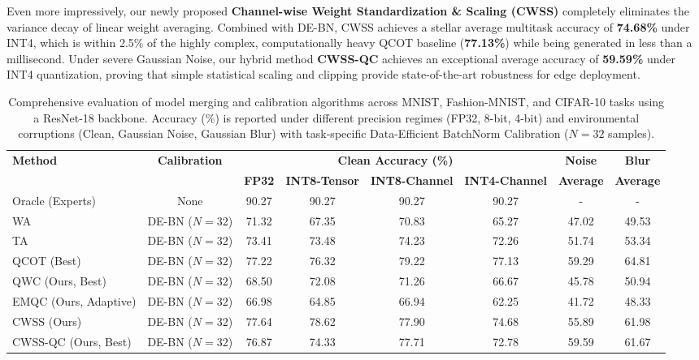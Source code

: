 \documentclass{article}
\theoremstyle{plain}
\theoremstyle{definition}
\theoremstyle{remark}
\begin{document}
Even more impressively, our newly proposed \textbf{Channel-wise Weight Standardization \& Scaling (CWSS)} completely eliminates the variance decay of linear weight averaging. Combined with DE-BN, CWSS achieves a stellar average multitask accuracy of \textbf{74.68\%} under INT4, which is within 2.5\% of the highly complex, computationally heavy QCOT baseline (\textbf{77.13\%}) while being generated in less than a millisecond. Under severe Gaussian Noise, our hybrid method \textbf{CWSS-QC} achieves an exceptional average accuracy of \textbf{59.59\%} under INT4 quantization, proving that simple statistical scaling and clipping provide state-of-the-art robustness for edge deployment.

\begin{table}[t]
\centering
\caption{Comprehensive evaluation of model merging and calibration algorithms across MNIST, Fashion-MNIST, and CIFAR-10 tasks using a ResNet-18 backbone. Accuracy (\%) is reported under different precision regimes (FP32, 8-bit, 4-bit) and environmental corruptions (Clean, Gaussian Noise, Gaussian Blur) with task-specific Data-Efficient BatchNorm Calibration ($N=32$ samples).}
\label{tab:main_results}
\small
\setlength{\tabcolsep}{4.0pt}
\begin{tabular}{l c cccc cc}
\hline
\textbf{Method} & \textbf{Calibration} & \multicolumn{4}{c}{\textbf{Clean Accuracy (\%)}} & \textbf{Noise} & \textbf{Blur} \\
\cline{3-6}
& & \textbf{FP32} & \textbf{INT8-Tensor} & \textbf{INT8-Channel} & \textbf{INT4-Channel} & \textbf{Average} & \textbf{Average} \\
\hline
Oracle (Experts) & None & 90.27 & 90.27 & 90.27 & 90.27 & - & - \\
\hline
WA & DE-BN ($N=32$) & 71.32 & 67.35 & 70.83 & 65.27 & 47.02 & 49.53 \\
TA & DE-BN ($N=32$) & 73.41 & 73.48 & 74.23 & 72.26 & 51.74 & 53.34 \\
QCOT (Best) & DE-BN ($N=32$) & 77.22 & 76.32 & 79.22 & 77.13 & 59.29 & 64.81 \\
QWC (Ours, Best) & DE-BN ($N=32$) & 68.50 & 72.08 & 71.26 & 66.67 & 45.78 & 50.94 \\
EMQC (Ours, Adaptive) & DE-BN ($N=32$) & 66.98 & 64.85 & 66.94 & 62.25 & 41.72 & 48.33 \\
CWSS (Ours) & DE-BN ($N=32$) & 77.64 & 78.62 & 77.90 & 74.68 & 55.89 & 61.98 \\
CWSS-QC (Ours, Best) & DE-BN ($N=32$) & 76.87 & 74.33 & 77.71 & 72.78 & 59.59 & 61.67 \\

\end{tabular}
\end{table}
\end{document}

